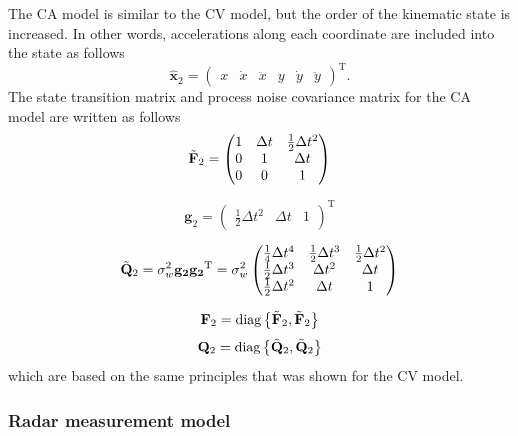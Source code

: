 \documentclass[english, 12pt, a4paper, elec, utf8, a-1b, online]{aaltothesis}
\renewcommand{\vec}[1]{\mathbf{#1}}
\newcommand{\transpose}[1]{#1^\text{T}}
\newcommand{\dt}{\Delta t}
\newcommand{\diag}[1]{\text{diag}\left\{ #1 \right\}}
\begin{document}
The CA model is similar to the CV model, but the order of the kinematic state is increased.
In other words, accelerations along each coordinate are included into the state as follows  
\begin{equation}\label{eq:x_mode2}
    \hat{\mathbf{x}}_2 =
        \transpose{
        \begin{pmatrix}
            x & \dot{x} & \ddot{x} & y & \dot{y} & \ddot{y}
        \end{pmatrix}}.
\end{equation}
The state transition matrix and process noise covariance matrix for the CA model are written as follows
\begin{equation}\label{eq:f_mode2}
    \Tilde{\vec{F}}_2 = 
    \begin{pmatrix}
        1 & \dt & \frac{1}{2}\dt^2  \\ 
        0 & 1 & \dt \\
        0 & 0 & 1  \\
    \end{pmatrix}
\end{equation}

\begin{equation}
    \vec{g}_2 = \transpose{
        \begin{pmatrix}
            \frac{1}{2} \dt^2 & \dt & 1
        \end{pmatrix}
    }
\end{equation}

\begin{equation}
    \Tilde{\vec{Q}}_2 = \sigma_w^2 \vec{g_2} \transpose{\vec{g_2}}  =  \sigma_w^2
        \begin{pmatrix}
            \frac{1}{4} \dt^4 & \frac{1}{2} \dt^3 & \frac{1}{2} \dt^2 \\ 
            \frac{1}{2} \dt^3 & \dt^2 &  \dt \\
            \frac{1}{2} \dt^2 & \dt & 1
        \end{pmatrix}
\end{equation}

\begin{equation}\label{eq:F_mode2}
\vec{F}_2 = \diag{\Tilde{\vec{F}}_2, \Tilde{\vec{F}}_2}
\end{equation}
\begin{equation}
    \vec{Q}_2 = \diag{\Tilde{\vec{Q}}_2, \Tilde{\vec{Q}}_2}
\end{equation}
which are based on the same principles that was shown for the CV model.

\subsubsection{Radar measurement model} \label{sec:measurement_model}
\end{document}
